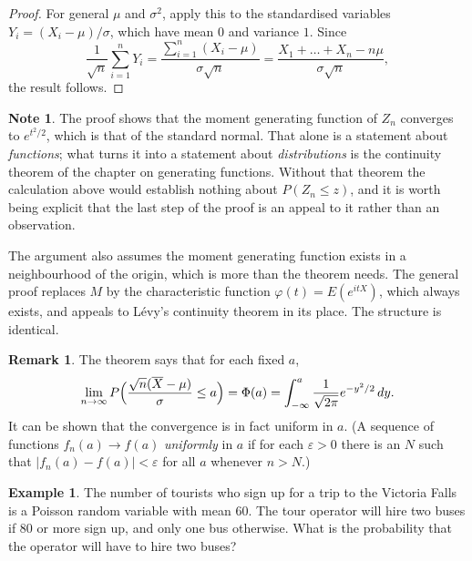 \documentclass[11pt,a4paper]{article}
\theoremstyle{definition}
\newtheorem{exa}[thm]{Example}
\newtheorem*{note}{Note}
\newtheorem*{remark}{Remark}
\begin{document}
\begin{proof}
For general $\mu$ and $\sigma^2$, apply this to the standardised variables $Y_i = (X_i - \mu)/\sigma$, which have mean $0$ and variance $1$. Since
\[
\frac{1}{\sqrt n}\sum_{i=1}^nY_i = \frac{\sum_{i=1}^n(X_i - \mu)}{\sigma\sqrt n} = \frac{X_1 + \dots + X_n - n\mu}{\sigma\sqrt n} ,
\]
the result follows.
\end{proof}

\begin{note}
The proof shows that the moment generating function of $Z_n$ converges to
$e^{t^{2}/2}$, which is that of the standard normal. That alone is a statement
about \emph{functions}; what turns it into a statement about \emph{distributions}
is the continuity theorem of the chapter on generating functions. Without that
theorem the calculation above would establish nothing about $P(Z_n\leq z)$, and
it is worth being explicit that the last step of the proof is an appeal to it
rather than an observation.

The argument also assumes the moment generating function exists in a
neighbourhood of the origin, which is more than the theorem needs. The general
proof replaces $M$ by the characteristic function $\varphi(t)=E(e^{itX})$, which
always exists, and appeals to L\'evy's continuity theorem in its place. The
structure is identical.
\end{note}

\begin{remark}
The theorem says that for each fixed $a$,
\[
\lim_{n\to\infty}P\Bigl(\frac{\sqrt n(\overline X - \mu)}{\sigma} \le a\Bigr) = \Phi(a) = \int_{-\infty}^a\frac{1}{\sqrt{2\pi}}e^{-y^2/2}\,dy .
\]
It can be shown that the convergence is in fact uniform in $a$. (A sequence of functions $f_n(a) \to f(a)$ \emph{uniformly} in $a$ if for each $\varepsilon > 0$ there is
an $N$ such that $|f_n(a) - f(a)| < \varepsilon$ for all $a$ whenever $n > N$.)
\end{remark}

\begin{exa}\label{exa:tourists}
The number of tourists who sign up for a trip to the Victoria Falls is a Poisson random variable with mean $60$. The tour
operator will hire two buses if $80$ or more sign up, and only one bus otherwise. What is the probability that the operator will
have to hire two buses?
\end{exa}
\end{document}
